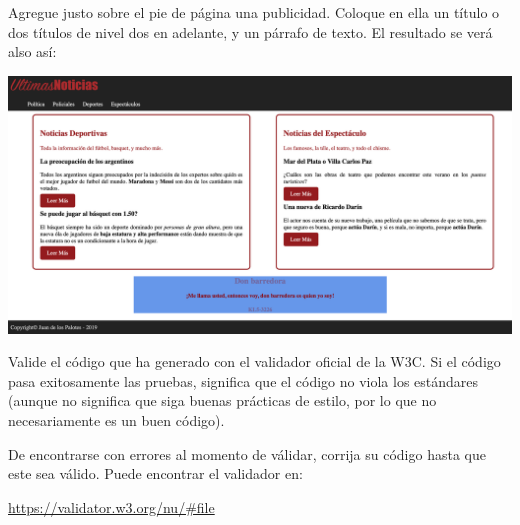 \begin{exercise}
Agregue justo sobre el pie de página una publicidad. Coloque en ella
un título o dos títulos de nivel dos en adelante, y un párrafo de
texto. El resultado se verá also así:

\includegraphics[scale=0.3]{apendices/html/imagenes/diario_6.png}
\end{exercise}

\begin{exercise}
  Valide el código que ha generado con el validador oficial de la W3C.
  Si el código pasa exitosamente las pruebas, significa que el código
  no viola los estándares (aunque no significa que siga buenas prácticas
  de estilo, por lo que no necesariamente es un buen código).

  De encontrarse con errores al momento de válidar, corrija su código
  hasta que este sea válido. Puede encontrar el validador en:

  \href{https://validator.w3.org/nu/\#file}{https://validator.w3.org/nu/\#file}
\end{exercise}


